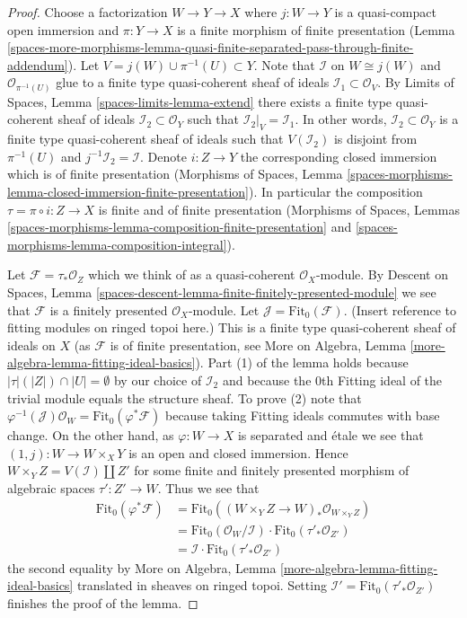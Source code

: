 \begin{proof}
Choose a factorization $W \to Y \to X$ where $j : W \to Y$ is a
quasi-compact open immersion and $\pi : Y \to X$ is a finite
morphism of finite presentation
(Lemma \ref{spaces-more-morphisms-lemma-quasi-finite-separated-pass-through-finite-addendum}).
Let $V = j(W) \cup \pi^{-1}(U) \subset Y$. Note that
$\mathcal{I}$ on $W \cong j(W)$ and $\mathcal{O}_{\pi^{-1}(U)}$
glue to a finite type quasi-coherent sheaf of ideals
$\mathcal{I}_1 \subset \mathcal{O}_V$. By
Limits of Spaces, Lemma \ref{spaces-limits-lemma-extend}
there exists a finite type quasi-coherent sheaf of ideals
$\mathcal{I}_2 \subset \mathcal{O}_Y$ such that
$\mathcal{I}_2|_V = \mathcal{I}_1$. In other words,
$\mathcal{I}_2 \subset \mathcal{O}_Y$
is a finite type quasi-coherent sheaf of ideals such that
$V(\mathcal{I}_2)$ is disjoint from $\pi^{-1}(U)$ and
$j^{-1}\mathcal{I}_2 = \mathcal{I}$. Denote $i : Z \to Y$
the corresponding closed immersion which is of finite presentation
(Morphisms of Spaces, Lemma
\ref{spaces-morphisms-lemma-closed-immersion-finite-presentation}).
In particular the composition $\tau = \pi \circ i : Z \to X$ is finite
and of finite presentation
(Morphisms of Spaces, Lemmas
\ref{spaces-morphisms-lemma-composition-finite-presentation} and
\ref{spaces-morphisms-lemma-composition-integral}).

\medskip\noindent
Let $\mathcal{F} = \tau_*\mathcal{O}_Z$ which we think of as
a quasi-coherent $\mathcal{O}_X$-module. By
Descent on Spaces, Lemma
\ref{spaces-descent-lemma-finite-finitely-presented-module}
we see that $\mathcal{F}$ is a finitely presented $\mathcal{O}_X$-module.
Let $\mathcal{J} = \text{Fit}_0(\mathcal{F})$. (Insert reference to
fitting modules on ringed topoi here.) This is a finite type quasi-coherent
sheaf of ideals on $X$ (as $\mathcal{F}$ is of finite presentation, see
More on Algebra, Lemma \ref{more-algebra-lemma-fitting-ideal-basics}).
Part (1) of the lemma holds because $|\tau|(|Z|) \cap |U| = \emptyset$
by our choice of $\mathcal{I}_2$ and because the $0$th Fitting ideal
of the trivial module equals the structure sheaf. To prove (2) note that
$\varphi^{-1}(\mathcal{J})\mathcal{O}_W = \text{Fit}_0(\varphi^*\mathcal{F})$
because taking Fitting ideals commutes with base change.
On the other hand, as $\varphi : W \to X$ is separated and \'etale
we see that $(1, j) : W \to W \times_X Y$ is an open and closed immersion.
Hence $W \times_Y Z = V(\mathcal{I}) \amalg Z'$ for some finite and
finitely presented morphism of algebraic spaces $\tau' : Z' \to W$.
Thus we see that
\begin{align*}
\text{Fit}_0(\varphi^*\mathcal{F}) & =
\text{Fit}_0((W \times_Y Z \to W)_*\mathcal{O}_{W \times_Y Z}) \\
& =
\text{Fit}_0(\mathcal{O}_W/\mathcal{I}) \cdot
\text{Fit}_0(\tau'_*\mathcal{O}_{Z'}) \\
& =
\mathcal{I} \cdot \text{Fit}_0(\tau'_*\mathcal{O}_{Z'})
\end{align*}
the second equality by
More on Algebra, Lemma \ref{more-algebra-lemma-fitting-ideal-basics}
translated in sheaves on ringed topoi.
Setting $\mathcal{I}' = \text{Fit}_0(\tau'_*\mathcal{O}_{Z'})$
finishes the proof of the lemma.
\end{proof}

